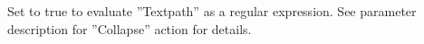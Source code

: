     Set to true to evaluate ''Textpath'' as a
  regular expression. See parameter description for ''Collapse''
  action for details.
